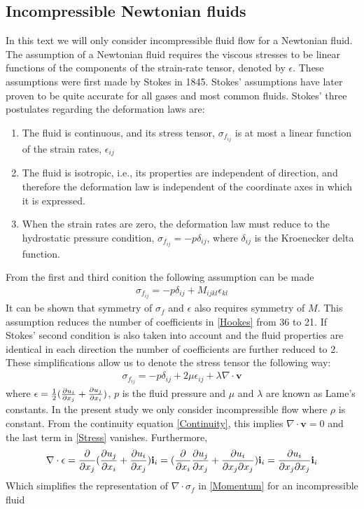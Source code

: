 \subsection{Incompressible Newtonian fluids}
In this text we will only consider incompressible fluid flow for a Newtonian fluid. 
The assumption of a Newtonian fluid requires the viscous stresses to be linear functions of the components of the strain-rate tensor, denoted by $\epsilon$. These assumptions were first made by Stokes in 1845. Stokes' assumptions have later proven to be quite accurate for all gases and most common fluids. Stokes' three postulates regarding the deformation laws are: \cite{Whit06}
\begin{enumerate}
\item The fluid is continuous, and its stress tensor, $\sigma_{f_{ij}}$ is at most a linear function of the strain rates, $\epsilon_{ij}$ 
\item The fluid is isotropic, i.e., its properties are independent of direction, and therefore the deformation law is independent of the coordinate axes in which it is expressed. 
\item When the strain rates are zero, the deformation law must reduce to the hydrostatic pressure condition, $\sigma_{f_{ij}} = -p\delta_{ij}$, where $\delta_{ij}$ is the Kroenecker delta function. 
\end{enumerate}


From the first and third conition the following assumption can be made
\begin{align}
\sigma_{f_{ij}} = -p\delta_{ij} + M_{ijkl}\epsilon_{kl} \label{Hookes}
\end{align}
It can be shown that symmetry of $\sigma_f$ and $\epsilon$ also requires symmetry of $M$. This assumption reduces the number of coefficients in \eqref{Hookes} from 36 to 21. If Stokes' second condition is also taken into account and the fluid properties are identical in each direction the number of coefficients are further reduced to 2. These simplifications allow us to denote the stress tensor the following way:
\begin{align}
\sigma_{f_{ij}} = -p\delta_{ij} + 2\mu\epsilon_{ij} + \lambda \nabla \cdot \mathbf{v} \label{Stress}
\end{align}
where $\epsilon = \frac{1}{2}(\frac{\partial u_i}{\partial x_j} + \frac{\partial u_j}{\partial x_i})$, $p$ is the fluid pressure and $\mu$ and $\lambda$ are known as Lame's constants. In the present study we only consider incompressible flow where $\rho$ is constant. From the continuity equation \eqref{Continuity}, this implies $\nabla \cdot \mathbf{v} = 0$ and the last term in \eqref{Stress} vanishes. Furthermore, 
\begin{align*}
\nabla \cdot \epsilon = \frac{\partial }{\partial x_j}(\frac{\partial u_j}{\partial x_i} + \frac{\partial u_i}{\partial x_j})\mathbf{i}_i = (\frac{\partial }{\partial x_i}\frac{\partial u_j}{\partial x_j} + \frac{\partial u_i}{\partial x_j \partial x_j})\mathbf{i}_i = \frac{\partial u_i}{\partial x_j \partial x_j} \mathbf{i}_i
\end{align*}
Which simplifies the representation of $\nabla \cdot \sigma_f$ in \eqref{Momentum} for an incompressible fluid

